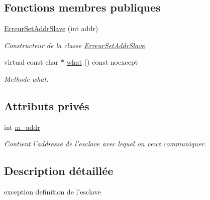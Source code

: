 \subsection*{Fonctions membres publiques}
\begin{DoxyCompactItemize}
\item 
\hyperlink{classCI2C_1_1ErreurSetAddrSlave_ac92f34eb7c68e1b29ae55e0b147bdc02}{Erreur\+Set\+Addr\+Slave} (int addr)
\begin{DoxyCompactList}\small\item\em Constructeur de la classe \hyperlink{classCI2C_1_1ErreurSetAddrSlave}{Erreur\+Set\+Addr\+Slave}. \end{DoxyCompactList}\item 
virtual const char $\ast$ \hyperlink{classCI2C_1_1ErreurSetAddrSlave_a6f82e7fa42f2ea5bb39d9c06517c5b09}{what} () const noexcept
\begin{DoxyCompactList}\small\item\em Methode what. \end{DoxyCompactList}\end{DoxyCompactItemize}
\subsection*{Attributs privés}
\begin{DoxyCompactItemize}
\item 
\hypertarget{classCI2C_1_1ErreurSetAddrSlave_aebf96cc2020fd45215280d41648151d8}{int \hyperlink{classCI2C_1_1ErreurSetAddrSlave_aebf96cc2020fd45215280d41648151d8}{m\+\_\+addr}}\label{classCI2C_1_1ErreurSetAddrSlave_aebf96cc2020fd45215280d41648151d8}

\begin{DoxyCompactList}\small\item\em Contient l'addresse de l'esclave avec lequel on veux communiquer. \end{DoxyCompactList}\end{DoxyCompactItemize}


\subsection{Description détaillée}
exception definition de l'esclave 

